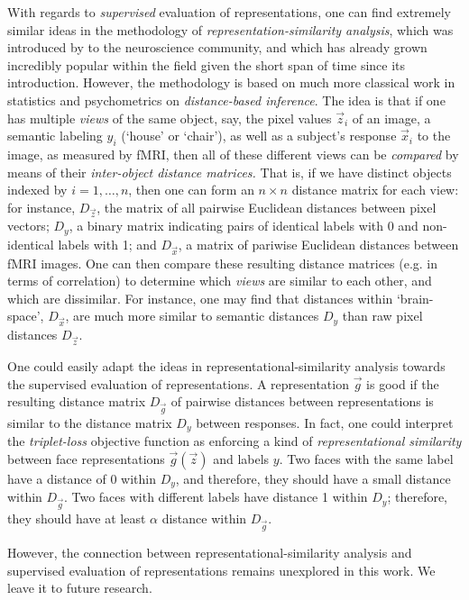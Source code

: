 With regards to \emph{supervised} evaluation of representations, one
can find extremely similar ideas in the methodology of
\emph{representation-similarity analysis}, which was introduced by
\cite{kriegeskorte2008representational} to the neuroscience community,
and which has already grown incredibly popular within the field given
the short span of time since its introduction.  However, the
methodology is based on much more classical work in statistics and
psychometrics on \emph{distance-based inference}.  The idea is that if
one has multiple \emph{views} of the same object, say, the pixel
values $\vec{z}_i$ of an image, a semantic labeling $y_i$ (`house' or
`chair'), as well as a subject's response $\vec{x}_i$ to the image, as
measured by fMRI, then all of these different views can be
\emph{compared} by means of their \emph{inter-object distance
  matrices.}  That is, if we have distinct objects indexed by $i =
1,\hdots, n$, then one can form an $n \times n$ distance matrix for
each view: for instance, $D_{\vec{z}}$, the matrix of all pairwise
Euclidean distances between pixel vectors; $D_{y}$, a binary matrix
indicating pairs of identical labels with 0 and non-identical labels
with 1; and $D_{\vec{x}}$, a matrix of pariwise Euclidean distances
between fMRI images.  One can then compare these resulting distance
matrices (e.g. in terms of correlation) to determine which
\emph{views} are similar to each other, and which are dissimilar.  For
instance, one may find that distances within `brain-space',
$D_{\vec{x}}$, are much more similar to semantic distances $D_{y}$
than raw pixel distances $D_{\vec{z}}$.

One could easily adapt the ideas in representational-similarity
analysis towards the supervised evaluation of representations.  A
representation $\vec{g}$ is good if the resulting distance matrix
$D_{\vec{g}}$ of pairwise distances between representations is similar
to the distance matrix $D_y$ between responses.  In fact, one could
interpret the \emph{triplet-loss} objective function as enforcing a
kind of \emph{representational similarity} between face
representations $\vec{g}(\vec{z})$ and labels $y$.  Two faces with the
same label have a distance of 0 within $D_y$, and therefore, they
should have a small distance within $D_{\vec{g}}$.  Two faces with
different labels have distance 1 within $D_y$; therefore, they should
have at least $\alpha$ distance within $D_{\vec{g}}$.

However, the connection between representational-similarity analysis
and supervised evaluation of representations remains unexplored in
this work.  We leave it to future research.

